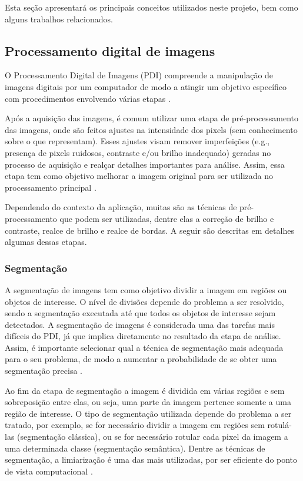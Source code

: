 \documentclass[12pt, a4paper, english, brazil]{article}
\begin{document}
Esta seção apresentará os principais conceitos utilizados neste projeto, bem como alguns trabalhos relacionados.

\subsection{Processamento digital de imagens}

O Processamento Digital de Imagens (PDI) compreende a manipulação de imagens digitais por um computador de modo a atingir um objetivo específico com procedimentos envolvendo várias etapas \cite{Gonzalez_Woods_2010}.

Após a aquisição das imagens, é comum utilizar uma etapa de pré-processamento das imagens, onde são feitos ajustes na intensidade dos pixels (sem conhecimento sobre o que representam). Esses ajustes visam remover imperfeições (e.g., presença de pixels ruidosos, contraste e/ou brilho inadequado) geradas no processo de aquisição e realçar detalhes importantes para análise. Assim, essa etapa tem como objetivo melhorar a imagem original para ser utilizada no processamento principal \cite{Marques_Filho_1999}.

Dependendo do contexto da aplicação, muitas são as técnicas de pré-processamento que podem ser utilizadas, dentre elas a correção de brilho e contraste, realce de brilho e realce de bordas. A seguir são descritas em detalhes algumas dessas etapas.

\subsubsection{Segmentação}

A segmentação de imagens tem como objetivo dividir a imagem em regiões ou objetos de interesse. O nível de divisões depende do problema a ser resolvido, sendo a segmentação executada até que todos os objetos de interesse sejam detectados. A segmentação de imagens é considerada uma das tarefas mais difíceis do PDI, já que implica diretamente no resultado da etapa de análise. Assim, é importante selecionar qual a técnica de segmentação mais adequada para o seu problema, de modo a aumentar a probabilidade de se obter uma segmentação precisa \cite{Gonzalez_Woods_2010}.

Ao fim da etapa de segmentação a imagem é dividida em várias regiões e sem sobreposição entre elas, ou seja, uma parte da imagem pertence somente a uma região de interesse. O tipo de segmentação utilizada depende do problema a ser tratado, por exemplo, se for necessário dividir a imagem em regiões sem rotulá-las (segmentação clássica), ou se for necessário rotular cada pixel da imagem a uma determinada classe (segmentação semântica). Dentre as técnicas de segmentação, a limiarização é uma das mais utilizadas, por ser eficiente do ponto de vista computacional \cite{Kuruvilla_2016}.
\end{document}
